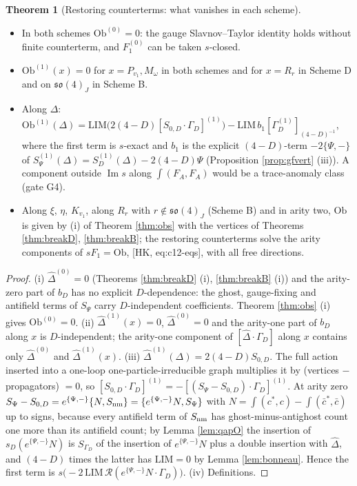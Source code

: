 \documentclass[11pt]{article}
\theoremstyle{definition}
\newtheorem{theorem}[definition]{Theorem}
\numberwithin{equation}{section}
\begin{document}
\begin{theorem}[Restoring counterterms: what vanishes in each scheme]
\label{thm:restore}
\mbox{}\begin{itemize}
\item[(i)] In both schemes $\mathrm{Ob}^{(0)}=0$: the gauge Slavnov--Taylor identity holds without finite counterterm, and $F^{(0)}_1$ can be taken $s$-closed.
\item[(ii)] $\mathrm{Ob}^{(1)}(x)=0$ for $x=P_{v_1},M_\omega$ in both schemes and for $x=R_r$ in Scheme D and on $\mathfrak{so}(4)_J$ in Scheme B.
\item[(iii)] Along $\Delta$: $\mathrm{Ob}^{(1)}(\Delta)=\mathrm{LIM}\big(2(4-D)[S_{0,D}\cdot\Gamma_D]^{(1)}\big)-\mathrm{LIM}\,b_1[\Gamma^{(1)}_D]_{(4-D)^{-1}}$, where the first term is $s$-exact and $b_1$ is the explicit $(4-D)$-term $-2\{\Psi,-\}$ of $S^{(1)}_\Psi(\Delta)=S^{(1)}_D(\Delta)-2(4-D)\Psi$ (Proposition \ref{prop:gfvert} (iii)). A component outside $\operatorname{Im}s$ along $\int(F_A,F_A)$ would be a trace-anomaly class (gate G4).
\item[(iv)] Along $\xi$, $\eta$, $K_{v_1}$, along $R_r$ with $r\notin\mathfrak{so}(4)_J$ (Scheme B) and in arity two, $\mathrm{Ob}$ is given by (i) of Theorem \ref{thm:obs} with the vertices of Theorems \ref{thm:breakD}, \ref{thm:breakB}; the restoring counterterms solve the arity components of $sF_1=\mathrm{Ob}$, [HK, eq:c12-eqs], with all free directions.
\end{itemize}
\end{theorem}

\begin{proof}
(i) $\widehat\Delta^{(0)}=0$ (Theorems \ref{thm:breakD} (i), \ref{thm:breakB} (i)) and the arity-zero part of $b_D$ has no explicit $D$-dependence: the ghost, gauge-fixing and antifield terms of $S_{\Psi}$ carry $D$-independent coefficients. Theorem \ref{thm:obs} (i) gives $\mathrm{Ob}^{(0)}=0$. (ii) $\widehat\Delta^{(1)}(x)=0$, $\widehat\Delta^{(0)}=0$ and the arity-one part of $b_D$ along $x$ is $D$-independent; the arity-one component of $[\widehat\Delta\cdot\Gamma_D]$ along $x$ contains only $\widehat\Delta^{(0)}$ and $\widehat\Delta^{(1)}(x)$. (iii) $\widehat\Delta^{(1)}(\Delta)=2(4-D)S_{0,D}$. The full action inserted into a one-loop one-particle-irreducible graph multiplies it by (vertices $-$ propagators) $=0$, so $[S_{0,D}\cdot\Gamma_D]^{(1)}=-[(S_\Psi-S_{0,D})\cdot\Gamma_D]^{(1)}$. At arity zero $S_\Psi-S_{0,D}=e^{\{\Psi,-\}}\{N,S_{\rm nm}\}=\{e^{\{\Psi,-\}}N,S_\Psi\}$ with $N=\int(c^*,c)-\int(\bar c^*,\bar c)$ up to signs, because every antifield term of $S_{\rm nm}$ has ghost-minus-antighost count one more than its antifield count; by Lemma \ref{lem:qapO} the insertion of $s_D(e^{\{\Psi,-\}}N)$ is $S_{\Gamma_D}$ of the insertion of $e^{\{\Psi,-\}}N$ plus a double insertion with $\widehat\Delta$, and $(4-D)$ times the latter has $\mathrm{LIM}=0$ by Lemma \ref{lem:bonneau}. Hence the first term is $s\big(-2\,\mathrm{LIM}\,\mathcal R(e^{\{\Psi,-\}}N\cdot\Gamma_D)\big)$. (iv) Definitions.
\end{proof}
\end{document}
